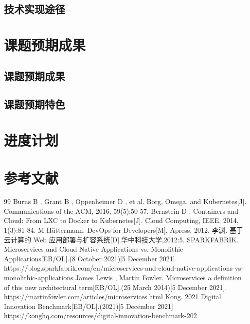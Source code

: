 \documentclass{article}
\begin{document}
\subsection{技术实现途径}


\section{课题预期成果}

\subsection{课题预期成果}

\subsection{课题预期特色}

\section{进度计划}

\section{参考文献}
\begin{thebibliography} {99}
     Burns B , Grant B , Oppenheimer D , et al. Borg, Omega, and Kubernetes[J]. Communications of the ACM, 2016, 59(5):50-57.
     Bernstein D . Containers and Cloud: From LXC to Docker to Kubernetes[J]. Cloud Computing, IEEE, 2014, 1(3):81-84.
     M Hüttermann. DevOps for Developers[M]. Apress, 2012.
     李渊. 基于云计算的 Web 应用部署与扩容系统[D].华中科技大学,2012:5.
     SPARKFABRIK. Microservices and Cloud Native Applications vs. Monolithic Applications[EB/OL].(8 October 2021)[5 December 2021]. https://blog.sparkfabrik.com/en/microservices-and-cloud-native-applications-vs-monolithic-applications
     James Lewis , Martin Fowler. Microservices a definition of this new architectural term[EB/OL].(25 March 2014)[5 December 2021]. https://martinfowler.com/articles/microservices.html
     Kong. 2021 Digital Innovation Benchmark[EB/OL].(2021)[5 December 2021] https://konghq.com/resources/digital-innovation-benchmark-202
\end{thebibliography}
\end{document}
